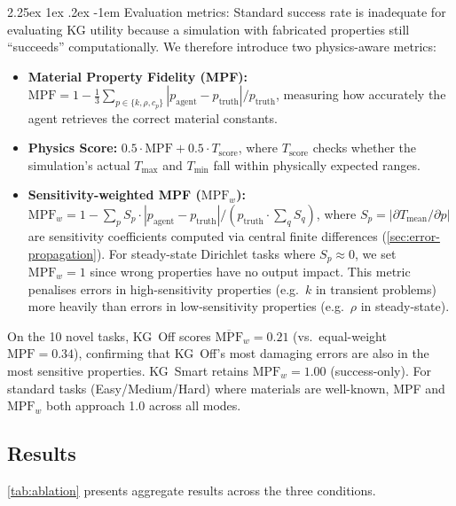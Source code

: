 \documentclass[preprint,review,12pt]{elsarticle}
\makeatletter
\renewcommand\paragraph{\@startsection{paragraph}{4}{\z@}%
  {2.25ex \@plus1ex \@minus.2ex}%
  {-1em}%
  {\normalfont\normalsize\bfseries}}
\makeatother
\begin{document}
\paragraph{Evaluation metrics:}
Standard success rate is inadequate for evaluating KG utility because
a simulation with fabricated properties still ``succeeds''
computationally.  We therefore introduce two physics-aware metrics:
\begin{itemize}
  \item \textbf{Material Property Fidelity (MPF):}
        $\text{MPF} = 1 - \frac{1}{3}\sum_{p \in \{k,\rho,c_p\}}
        |p_\text{agent} - p_\text{truth}| / p_\text{truth}$, measuring
        how accurately the agent retrieves the correct material constants.
  \item \textbf{Physics Score:} $0.5 \cdot \text{MPF} + 0.5 \cdot
        T_\text{score}$, where $T_\text{score}$ checks whether the
        simulation's actual $T_\text{max}$ and $T_\text{min}$ fall within
        physically expected ranges.
  \item \textbf{Sensitivity-weighted MPF ($\text{MPF}_w$):}
        $\text{MPF}_w = 1 - \sum_{p} S_p \cdot |p_\text{agent} -
        p_\text{truth}| / (p_\text{truth} \cdot \sum_q S_q)$, where
        $S_p = |\partial T_{\text{mean}} / \partial p|$ are sensitivity
        coefficients computed via central finite differences
        (\cref{sec:error-propagation}).
        For steady-state Dirichlet tasks where $S_p \approx 0$, we set
        $\text{MPF}_w{=}1$ since wrong properties have no output impact.
        This metric penalises errors in high-sensitivity properties
        (e.g.\ $k$ in transient problems) more heavily than errors in
        low-sensitivity properties (e.g.\ $\rho$ in steady-state).
\end{itemize}
On the 10 novel tasks, KG~Off scores $\overline{\text{MPF}}_w{=}0.21$
(vs.\ equal-weight $\text{MPF}{=}0.34$), confirming that KG~Off's most
damaging errors are also in the most sensitive properties.
KG~Smart retains $\text{MPF}_w{=}1.00$ (success-only).
For standard tasks (Easy/Medium/Hard) where materials are well-known,
MPF and $\text{MPF}_w$ both approach 1.0 across all modes.

\subsection{Results}

\cref{tab:ablation} presents aggregate results across the three
conditions.
\end{document}
